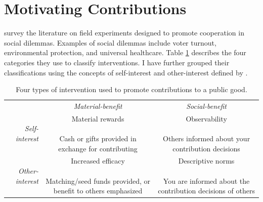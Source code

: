 \documentclass[conference]{IEEEtran}
\newcommand{\1}{\mathds{1}}
\newcommand{\myrotate}[1]{#1}
\newcommand{\PreserveBackslash}[1]{\let\temp=\\#1\let\\=\temp}
\newcommand{\mycell}[1]{\parbox[m]{1.1in}{\PreserveBackslash\raggedright \vspace{7pt} #1 \vspace{7pt}}}
\begin{document}
\section{Motivating Contributions}

\citet{Kraft-Todd} survey the literature on field experiments designed
to promote cooperation in social dilemmas. Examples of social dilemmas include voter turnout,
environmental protection, and universal healthcare. Table
\ref{tab:kraft-todd} describes the four categories they use to
classify interventions. I have further grouped their classifications
using the concepts of self-interest and other-interest defined by
\citet{Gerbasi}.

\begin{table}[h!tbp]
  \renewcommand{\arraystretch}{2}
  \caption{Four types of intervention used to promote contributions to a public good.}
  \label{tab:kraft-todd}
  \begin{tabular}{r|c|c|}

    \multicolumn{1}{c}{} & \multicolumn{1}{c}{\textit{Material-benefit}} & \multicolumn{1}{c}{\textit{Social-benefit}} \\
    \cline{2-3}

    \myrotate{\textit{Self-interest}} & \mycell{ Material rewards \\ \\ Cash or gifts provided in exchange for contributing } & \mycell{Observability \\ \\ Others informed about your contribution decisions} \\


    \myrotate{\textit{Other-interest}} & \mycell{ Increased efficacy \\ \\ Matching/seed funds provided, or benefit to others emphasized } & \mycell{Descriptive norms \\ \\ You are informed about the contribution decisions of others} \\

  \end{tabular}
\end{table}
\end{document}
